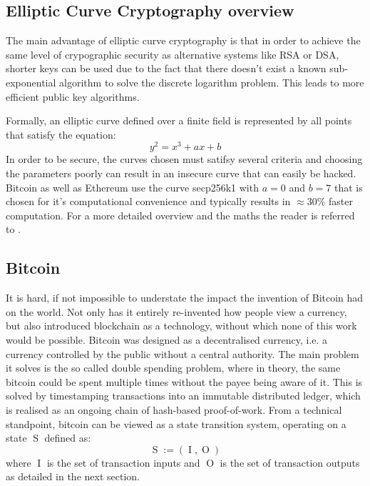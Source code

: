 \documentclass[12pt,msc,a4paper,oneside]{ucl_thesis}
\DeclareMathOperator{\Btcstate}{S}
\DeclareMathOperator{\Btcinput}{I}
\DeclareMathOperator{\Btcoutput}{O}
\begin{document}
\subsection{Elliptic Curve Cryptography overview} \label{sec:background_elliptic_curve}
The main advantage of elliptic curve cryptography is that in order to achieve the same level of crypographic security as alternative systems like RSA or DSA, shorter keys can be used due to the fact that there doesn't exist a known sub-exponential algorithm to solve the discrete logarithm problem. This leads to more efficient public key algorithms. \cite{EllipticCurveOverview} \cite{Araki1998} 

Formally, an elliptic curve defined over a finite field is represented by all points that satisfy the equation:
\begin{equation}
    y^2 = x^3 + ax + b
\end{equation}
In order to be secure, the curves chosen must satifsy several criteria and choosing the parameters poorly can result in an insecure curve that can easily be hacked. Bitcoin as well as Ethereum use the curve secp256k1 with $a = 0$ and $b = 7$ that is chosen for it's computational convenience and typically results in $\approx 30\%$ faster computation. For a more detailed overview and the maths the reader is referred to \cite{smart2003cryptography}.

\subsection{Bitcoin} \label{sec:background_bitcoin}
It is hard, if not impossible to understate the impact the invention of Bitcoin had on the world. Not only has it entirely re-invented how people view a currency, but also introduced blockchain as a technology, without which none of this work would be possible. Bitcoin was designed as a decentralised currency, i.e. a currency controlled by the public without a central authority. The main problem it solves is the so called double spending problem, where in theory, the same bitcoin could be spent multiple times without the payee being aware of it. This is solved by timestamping transactions into an immutable distributed ledger, which is realised as an ongoing chain of hash-based proof-of-work. From a technical standpoint, bitcoin can be viewed as a state transition system, operating on a state $\Btcstate$ defined as:
\begin{equation}
    \Btcstate := (\Btcinput, \Btcoutput)
\end{equation}
where $\Btcinput$ is the set of transaction inputs and $\Btcoutput$ is the set of transaction outputs as detailed in the next section.
\end{document}
